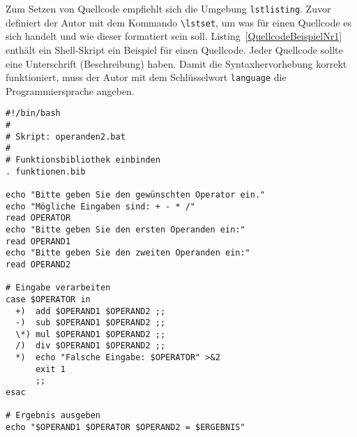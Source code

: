 \documentclass{llncs}
\begin{document}
Zum Setzen von Quellcode empfiehlt sich die Umgebung \verb!lstlisting!. Zuvor definiert der Autor mit dem Kommando \verb!\lstset!, um was für einen Quellcode es sich handelt und wie dieser formatiert sein soll. Listing~\ref{QuellcodeBeispielNr1} enthält ein Shell-Skript ein Beispiel für einen Quellcode. Jeder Quellcode sollte eine Unterschrift (Beschreibung) haben. Damit die Syntaxhervorhebung korrekt funktioniert, muss der Autor mit dem Schlüsselwort \verb!language! die Programmiersprache angeben. 


\lstset{
language=Bash,
captionpos=b, 
caption=Das ist die Unterschrift des Quellcodes, 
label=QuellcodeBeispielNr1,
basicstyle=\ttfamily\footnotesize,      %
keywordstyle=\color{FrankfurtBlue},     %
commentstyle=\color{gray},              %
numbers=left,                           %
numberstyle=\footnotesize,              %
stepnumber=1,                           %
numbersep=5pt,                          %
backgroundcolor=\color{lightlightgray}, %
frame=none,                             %
tabsize=2,                              %
captionpos=b,                           %
breaklines=true,                        %
breakatwhitespace=false,                %
showspaces=false,                       %
showstringspaces=false                  %
showtabs=false,                         %
columns=fixed,                          %
morekeywords={},                        %
literate=%
{Ö}{{\"O}}1
{Ä}{{\"A}}1
{Ü}{{\"U}}1
{ö}{{\"o}}1
{ä}{{\"a}}1
{ü}{{\"u}}1
{ß}{{\ss}}1
{~}{{\textasciitilde}}1
}
\begin{lstlisting}
#!/bin/bash
#
# Skript: operanden2.bat
#
# Funktionsbibliothek einbinden
. funktionen.bib

echo "Bitte geben Sie den gewünschten Operator ein."
echo "Mögliche Eingaben sind: + - * /"
read OPERATOR
echo "Bitte geben Sie den ersten Operanden ein:"
read OPERAND1
echo "Bitte geben Sie den zweiten Operanden ein:"
read OPERAND2

# Eingabe verarbeiten 
case $OPERATOR in
  +)  add $OPERAND1 $OPERAND2 ;;
  -)  sub $OPERAND1 $OPERAND2 ;;
  \*) mul $OPERAND1 $OPERAND2 ;;
  /)  div $OPERAND1 $OPERAND2 ;;
  *)  echo "Falsche Eingabe: $OPERATOR" >&2
      exit 1
      ;;
esac

# Ergebnis ausgeben
echo "$OPERAND1 $OPERATOR $OPERAND2 = $ERGEBNIS"
\end{lstlisting}
\end{document}
